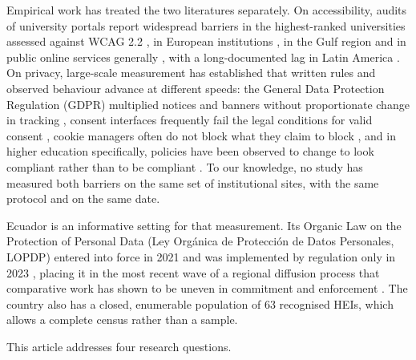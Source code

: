 \documentclass[pdflatex,sn-basic,Numbered]{sn-jnl}
\theoremstyle{thmstyleone}
\theoremstyle{thmstyletwo}
\theoremstyle{thmstylethree}
\begin{document}
Empirical work has treated the two literatures separately. On accessibility, audits of university portals report widespread barriers in the highest-ranked universities assessed against WCAG 2.2 \citep{krittika2025accessibility}, in European institutions \citep{krejtz2025higher}, in the Gulf region \citep{fakrudeen2025evaluation} and in public online services generally \citep{aljedaani2025egovernment,iniesto2025service}, with a long-documented lag in Latin America \citep{campoverdemolina2023accessibility,acostavargas2020dataset}. On privacy, large-scale measurement has established that written rules and observed behaviour advance at different speeds: the General Data Protection Regulation (GDPR) \citep{gdpr2016} multiplied notices and banners without proportionate change in tracking \citep{degeling2019value,trevisan2019four,kretschmer2021cookie}, consent interfaces frequently fail the legal conditions for valid consent \citep{matte2020cookie,nouwens2020dark,gray2021dark,habib2022okay}, cookie managers often do not block what they claim to block \citep{sanchezrola2019can,bollinger2022automating}, and in higher education specifically, policies have been observed to change to look compliant rather than to be compliant \citep{munot2025compliance}. To our knowledge, no study has measured both barriers on the same set of institutional sites, with the same protocol and on the same date.

Ecuador is an informative setting for that measurement. Its Organic Law on the Protection of Personal Data (Ley Org\'anica de Protecci\'on de Datos Personales, LOPDP) entered into force in 2021 and was implemented by regulation only in 2023 \citep{lopdp2021,reglamentolopdp2023}, placing it in the most recent wave of a regional diffusion process that comparative work has shown to be uneven in commitment and enforcement \citep{carrillo2022follow,chavarriamora2025lack}. The country also has a closed, enumerable population of 63 recognised HEIs, which allows a complete census rather than a sample.

This article addresses four research questions.
\end{document}
